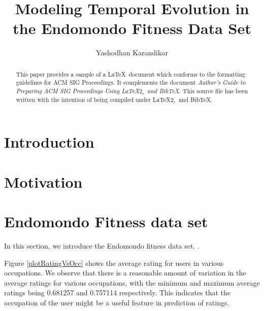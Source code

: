 \documentclass{acm_proc_article-sp}
\begin{document}
\title{Modeling Temporal Evolution in the Endomondo Fitness Data Set}
%
%
\author{
\alignauthor
Yashodhan Karandikar\\
}

\maketitle
\begin{abstract}
This paper provides a sample of a \LaTeX\ document which conforms to the formatting guidelines for ACM SIG Proceedings.
It complements the document \textit{Author's Guide to Preparing
ACM SIG Proceedings Using \LaTeX$2_\epsilon$\ and Bib\TeX}. This
source file has been written with the intention of being
compiled under \LaTeX$2_\epsilon$\ and BibTeX.

\end{abstract}

\section{Introduction}

\section{Motivation}

\section{Endomondo Fitness data set}
\label{expAnalysis}
In this section, we introduce the Endomondo fitness data set. \cite{mldataset}. 

\begin{comment}
\begin{figure}[h]
\centering
\texttt{[image: plots/rating\_vs\_age]}
\caption{\label{plotRatingVsAge}Average rating for different age groups}
\end{figure}

\begin{figure*}
\centering
\texttt{[image: plots/rating\_vs\_occupation]}
\caption{\label{plotRatingVsOcc} Average rating for various occupations}
\end{figure*}
\end{comment}

Figure \ref{plotRatingVsOcc} shows the average rating for users in various occupations. We observe that there is a reasonable amount of variation in the average ratings for various occupations, with the minimum and maximum average ratings being 0.681257 and 0.757114 respectively. This indicates that the occupation of the user might be a useful feature in prediction of ratings.
\end{document}
